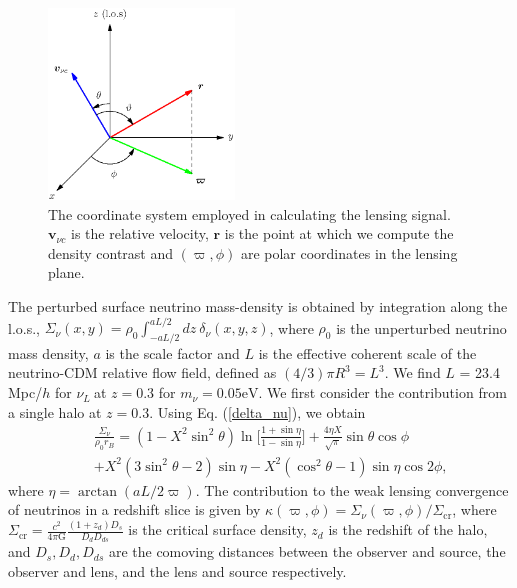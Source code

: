\documentclass[aps,prl,twocolumn,showpacs,superscriptaddress,groupedaddress,nofootinbib]{revtex4}  %
\newcommand{\mr}{\mathrm}
\newcommand{\nul}{\ensuremath{{\nu_L~}}}
\begin{document}
\begin{figure}[tbp]
  \begin{center}
    \includegraphics[width=0.44\textwidth]{fig_2.eps}
  \end{center}
  \vspace{-0.7cm}
  \caption{ The coordinate system employed in calculating the lensing
    signal.  $\bm v_{\nu c}$ is the relative velocity, $\bm r$ is the
    point at which we compute the density contrast and $(\varpi,
    \phi)$ are polar coordinates in the lensing plane.}
  \label{fig:coords}
\end{figure}
The perturbed surface neutrino mass-density is obtained by integration along the
l.o.s., $\Sigma_\nu(x,y)=\rho_0\int^{aL/2}_{-aL/2} dz~\delta_\nu(x,y,z)$,
where $\rho_0$ is the unperturbed neutrino mass density, $a$ is the scale 
factor and $L$ is the
effective coherent scale of the neutrino-CDM relative flow field,
defined as $(4/3)\pi R^3=L^3$.  We find $L$ = 23.4 Mpc/$h$ for
\nul at $z=0.3$ for $m_\nu=0.05\mr{eV}$. 
We first consider the contribution from a single halo at $z=0.3$.
Using Eq. (\ref{delta_nu}), we obtain
\begin{eqnarray}
&&  \frac{\Sigma_\nu}{\rho_0r_B}=(1-X^2\sin^2\theta)
  \ln\bigg[\frac{1+\sin\eta}{1-\sin\eta}\bigg]+\frac{4\eta X}{\sqrt{\pi}}\sin\theta\cos\phi
   \nonumber \\
  && +X^2(3\sin^2\theta-2)\sin\eta
  -X^2(\cos^2\theta-1)\sin\eta\cos2\phi,\nonumber
\end{eqnarray}
where $\eta = \arctan(aL/2 \varpi)$.  
The contribution to the weak lensing convergence of neutrinos in a redshift slice is given by
$\kappa(\varpi,\phi)=\Sigma_\nu(\varpi,\phi)/\Sigma_{\mr{cr}}$, where
$\Sigma_{\mr{cr}}=\frac{c^2}{4\pi\mr{G}}\frac{(1+z_d)D_s}{D_dD_{ds}}$
is the critical surface density, $z_d$ is the redshift of the
halo, and $D_s, D_d, D_{ds}$ are the comoving distances between the
observer and source, the observer and lens, and the lens and source
respectively. 
\end{document}
